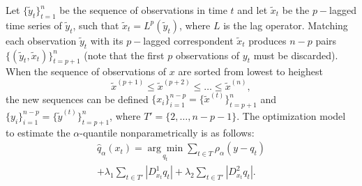 



Let $\{\tilde{y}_t \}_{t=1}^n$ be the sequence of observations in time $t$ and let $\tilde{x}_t$ be the $p-$lagged time series of $\tilde{y}_t$, such that $\tilde{x}_t = L^p(\tilde{y}_t)$, where $L$ is the lag operator. Matching each observation $\tilde{y}_t$ with its $p-$lagged correspondent $\tilde{x}_t$ produces $n-p$ pairs $\{(\tilde{y}_t,\tilde{x}_t)\}_{t=p+1}^n$ (note that the first $p$ observations of $y_t$ must be discarded). When the sequence of observations of $x$ are sorted from lowest to heighest
$$\tilde{x}^{(p+1)} \leq \tilde{x}^{(p+2)} \leq \dots \leq \tilde{x}^{(n)},$$ 
the new sequences can be defined $\{x_i\}_{i=1}^{n-p} = \{\tilde{x}^{(t)} \}_{t=p+1}^{n}$ and $\{y_i\}_{i=1}^{n-p} = \{\tilde{y}^{(t)} \}_{t=p+1}^{n}$, where $T' = \{2,\dots, n-p-1\}$. 
The optimization model to estimate the $\alpha$-quantile nonparametrically is as follows:
\begin{equation}
\begin{split}
\hat{q}_{\alpha}(x_t) =\underset{q_{t}}{\arg\min}\sum_{t\in T} \rho_{\alpha} \left( y - q_{t} \right) \\ +\lambda_1  \sum_{t\in T'}|D_{x_t}^{1}q_{t}| +\lambda_2  \sum_{t\in T'}|D_{x_t}^{2}q_{t}|.
\end{split}
\end{equation}


